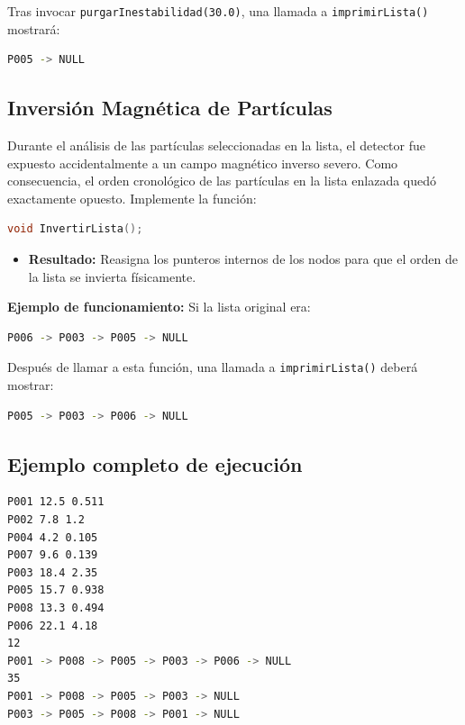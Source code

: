 \documentclass[11pt, letterpaper]{article}
\begin{document}
Tras invocar \texttt{purgarInestabilidad(30.0)}, una llamada a \texttt{imprimirLista()} mostrará:
\begin{lstlisting}[language=bash]
P005 -> NULL
\end{lstlisting}

\subsection{Inversión Magnética de Partículas}
Durante el análisis de las partículas seleccionadas en la lista, el detector fue expuesto accidentalmente a un campo magnético inverso severo. Como consecuencia, el orden cronológico de las partículas en la lista enlazada quedó exactamente opuesto. Implemente la función:
\begin{lstlisting}[language=C++]
void InvertirLista();
\end{lstlisting}
\begin{itemize}[noitemsep, topsep=0pt]
    \item \textbf{Resultado:} Reasigna los punteros internos de los nodos para que el orden de la lista se invierta físicamente.
\end{itemize}

\textbf{Ejemplo de funcionamiento:}
Si la lista original era:
\begin{lstlisting}[language=bash]
P006 -> P003 -> P005 -> NULL
\end{lstlisting}

Después de llamar a esta función, una llamada a \texttt{imprimirLista()} deberá mostrar:
\begin{lstlisting}[language=bash]
P005 -> P003 -> P006 -> NULL
\end{lstlisting}

\subsection{Ejemplo completo de ejecución}
\begin{lstlisting}[language=bash]
P001 12.5 0.511
P002 7.8 1.2
P004 4.2 0.105
P007 9.6 0.139
P003 18.4 2.35
P005 15.7 0.938
P008 13.3 0.494
P006 22.1 4.18
12
P001 -> P008 -> P005 -> P003 -> P006 -> NULL
35
P001 -> P008 -> P005 -> P003 -> NULL
P003 -> P005 -> P008 -> P001 -> NULL
\end{lstlisting}
\end{document}
